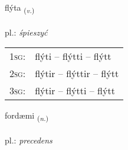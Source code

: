 \documentclass[frontgrid, backgrid]{flacards}\usepackage[]{graphicx}\usepackage[]{xcolor}
\begin{document}
\renewcommand{\flhead}{\vskip5pt \fboxsep=0pt {\small\bfseries\footnotesize Sagnorð | czasownik}}
\renewcommand{\fcfoot}{\vskip5pt \fboxsep=0pt \hspace{2pt}{\small\bfseries\footnotesize 3K}}

\renewcommand{\blhead}{\vskip5pt {\small\bfseries\footnotesize Sagnorð | czasownik }}
\renewcommand{\bcfoot}{\vskip5pt \hspace{2pt}{\small\bfseries\footnotesize 3K}}


{flýta \small{\textsubscript{(\textit{v.})}} \\[1ex] %
\textphonetic{[fliːta]} \\
pl.: \emph{śpieszyć} \\  [2ex]
\renewcommand*{\arraystretch}{0.8}
\begin{tabular}{p{1cm}l}
\textsc{1sg}: & flýti -- flýtti -- flýtt \\ 
\textsc{2sg}: & flýtir -- flýttir -- flýtt \\ 
\textsc{3sg}: & flýtir -- flýtti -- flýtt \\ 
\end{tabular}
}

\renewcommand{\flhead}{\vskip5pt \fboxsep=0pt {\small\bfseries\footnotesize Nafnorð | rzeczownik}}
\renewcommand{\fcfoot}{\vskip5pt \fboxsep=0pt \hspace{2pt}{\small\bfseries\footnotesize 3K}}

\renewcommand{\blhead}{\vskip5pt {\small\bfseries\footnotesize Nafnorð | rzeczownik }}
\renewcommand{\bcfoot}{\vskip5pt \hspace{2pt}{\small\bfseries\footnotesize 3K}}


{fordæmi \small{\textsubscript{(\textit{n.})}} \\[1ex] %
\textphonetic{[fɔrtaimɪ]} \\
pl.: \emph{precedens} \\  [2ex]
\renewcommand*{\arraystretch}{0.8}
}
\end{document}
